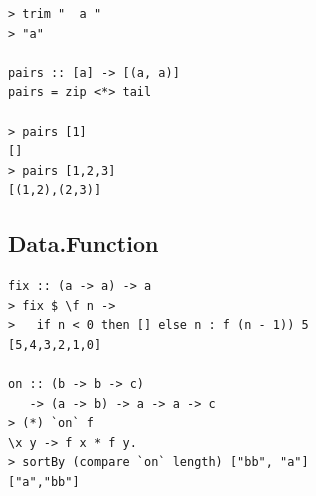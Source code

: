 \begin{multicols}{2}
\begin{box2}
\begin{verbatim}
> trim "  a "
> "a"

pairs :: [a] -> [(a, a)]
pairs = zip <*> tail

> pairs [1]
[]
> pairs [1,2,3]
[(1,2),(2,3)]
\end{verbatim}
\end{box2}

\begin{box1}
\subsection *{Data.Function}
\begin{verbatim}
fix :: (a -> a) -> a
> fix $ \f n ->
>   if n < 0 then [] else n : f (n - 1)) 5
[5,4,3,2,1,0]

on :: (b -> b -> c)
   -> (a -> b) -> a -> a -> c
> (*) `on` f 
\x y -> f x * f y.
> sortBy (compare `on` length) ["bb", "a"]
["a","bb"]

\end{verbatim}
\end{box1}


\end{multicols}

